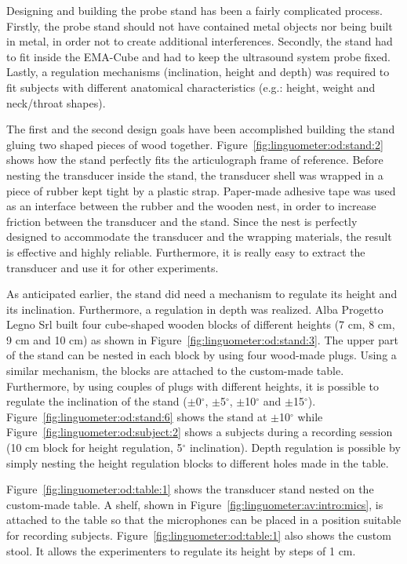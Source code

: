 Designing and building the probe stand has been a fairly complicated process. 
Firstly, the probe stand should not have contained metal objects nor being
built in metal, in order not to create additional interferences.
Secondly, the stand had to fit inside the EMA-Cube and had to keep the
ultrasound system probe fixed. 
Lastly, a regulation mechanisms (inclination, height and depth) was required to
fit subjects with different anatomical characteristics (e.g.: height, weight and
neck/throat shapes).


The first and the second design goals have been accomplished building the 
stand gluing two shaped pieces of wood together.
Figure~\ref{fig:linguometer:od:stand:2} shows how the stand perfectly fits the 
articulograph frame of reference. 
Before nesting the transducer inside the stand, the transducer shell was wrapped
in a piece of rubber kept tight by a plastic strap. 
Paper-made adhesive tape was used as an interface between the rubber and the
wooden nest, in order to increase friction between the transducer and the
stand.
Since the nest is perfectly designed to accommodate the transducer and the
wrapping materials, the result is effective and highly reliable. 
Furthermore, it is really easy to extract the transducer and use it for other
experiments.

As anticipated earlier, the stand did need a mechanism to regulate its height
and its inclination. Furthermore, a regulation in depth was realized.
Alba Progetto Legno Srl built four cube-shaped wooden blocks of different
heights (7 cm, 8 cm, 9 cm and 10 cm) as shown in
Figure~\ref{fig:linguometer:od:stand:3}.
The upper part of the stand can be nested in each block by using four wood-made
plugs.
Using a similar mechanism, the blocks are attached to the custom-made table.
Furthermore, by using couples of plugs with different heights, it is possible to
regulate the inclination of the stand 
($\pm$0$^{\circ}$, $\pm$5$^{\circ}$, $\pm$10$^{\circ}$ and $\pm$15$^{\circ}$).
Figure~\ref{fig:linguometer:od:stand:6} shows the stand at $\pm$10$^{\circ}$
while Figure~\ref{fig:linguometer:od:subject:2} shows a subjects during a
recording session (10 cm block for height regulation, 5$^{\circ}$ inclination).
Depth regulation is possible by simply nesting the height regulation blocks to
different holes made in the table.

Figure~\ref{fig:linguometer:od:table:1} shows the transducer stand nested on the
custom-made table. A shelf, shown in Figure~\ref{fig:linguometer:av:intro:mics},
is attached to the table so that the microphones can be placed in a position 
suitable for recording subjects.
Figure~\ref{fig:linguometer:od:table:1} also shows the custom stool. 
It allows the experimenters to regulate its height by steps of 1 cm.

